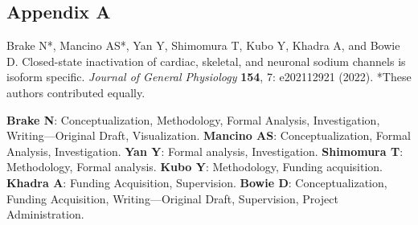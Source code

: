\vspace{-.5em}
\subsection*{Appendix A}

Brake N*, Mancino AS*, Yan Y, Shimomura T, Kubo Y, Khadra A, and Bowie D. Closed-state inactivation of cardiac, skeletal, and neuronal sodium channels is isoform specific. \textit{Journal of General Physiology} \textbf{154}, 7: e202112921 (2022). *These authors contributed equally.

{\small \textbf{Brake N}: Conceptualization, Methodology, Formal Analysis, Investigation, Writing—Original Draft, Visualization.  \textbf{Mancino AS}: Conceptualization, Formal Analysis, Investigation. \textbf{Yan Y}: Formal analysis, Investigation. \textbf{Shimomura T}: Methodology, Formal analysis. \textbf{Kubo Y}: Methodology, Funding acquisition. \textbf{Khadra A}: Funding Acquisition, Supervision. \textbf{Bowie D}: Conceptualization, Funding Acquisition, Writing—Original Draft, Supervision, Project Administration.}


\setlength{\parskip}{6pt}
\setlength{\parindent}{17pt}